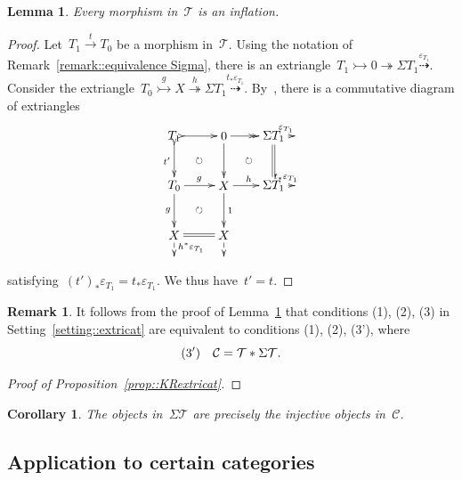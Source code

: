 \documentclass{amsart}
\newtheorem{corollary}[theorem]{Corollary}
\newtheorem{lemma}[theorem]{Lemma}
\theoremstyle{definition}
\newtheorem{remark}[theorem]{Remark}
\newcommand{\cat}{\mathcal{C}}
\newcommand{\susp}{\Sigma}
\newcommand{\tc}{\mathcal{T}}
\newcommand{\infl}{\rightarrowtail}
\newcommand{\defl}{\twoheadrightarrow}
\newcommand{\eps}{\varepsilon}
\begin{document}
\begin{lemma}\label{lemma:: mphs in T are inflations}
Every morphism in~$\tc$ is an inflation.
\end{lemma}

\begin{proof}
Let~$T_1 \overset{t}{\to} T_0$ be a morphism in~$\tc$.
Using the notation of Remark~\ref{remark::equivalence Sigma}, there is an extriangle~$T_1\infl 0\defl \susp T_1 \overset{\eps_{T_1}}{\dashrightarrow}$.
Consider the extriangle~$T_0\overset{g}{\infl} X \overset{h}{\defl} \susp T_1 \overset{t_\ast\eps_{T_1}}{\dashrightarrow}$.
By~\cite[Proposition 3.17]{NakaokaPalu}, there is a commutative diagram of extriangles
\[
\xy
(-7,7)*+{T_1}="2";
(7,7)*+{0}="4";
(21,7)*+{\susp T_1}="6";
(28,7)*+{}="8";
%
(-7,-7)*+{T_0}="12";
(7,-7)*+{X}="14";
(21,-7)*+{\susp T_1}="16";
(28,-7)*+{}="18";
%
(-7,-21)*+{X}="22";
(7,-21)*+{X}="24";
%
(-7,-28)*+{}="32";
(7,-28)*+{}="34";
%
{\ar@{>->} "2";"4"};
{\ar@{->>} "4";"6"};
{\ar@{-->}^{\eps_{T_1}} "6";"8"};
%
{\ar@{>->}_{t'} "2";"12"};
{\ar "4";"14"};
{\ar@{=} "6";"16"};
%
{\ar^{g} "12";"14"};
{\ar^{h} "14";"16"};
{\ar@{-->}^{t_\ast\eps_{T_1}} "16";"18"};
%
{\ar_{g} "12";"22"};
{\ar^{1} "14";"24"};
%
{\ar@{=} "22";"24"};
%
{\ar@{-->}^{h^\ast\eps_{T_1}} "22";"32"};
{\ar@{-->} "24";"34"};
%
{\ar@{}|\circlearrowright "2";"14"};
{\ar@{}|\circlearrowright "4";"16"};
{\ar@{}|\circlearrowright "12";"24"};
\endxy
\]
satisfying~$(t')_\ast\eps_{T_1}=t_\ast\eps_{T_1}$.
We thus have~$t'=t$.
\end{proof}

\begin{remark}
 It follows from the proof of Lemma~\ref{lemma:: mphs in T are inflations} that conditions (1), (2), (3) in Setting~\ref{setting::extricat} are equivalent to conditions (1), (2), (3'), where
\[
{\rm (3')} \ \ \ \cat = \tc\ast\susp\tc.
\]
\end{remark}


\begin{proof}[Proof of Proposition~\ref{prop::KRextricat}]

\end{proof}

\begin{corollary}
The objects in~$\susp\tc$ are precisely the injective objects in~$\cat$.
\end{corollary}


\subsection{Application to certain categories}
\end{document}
